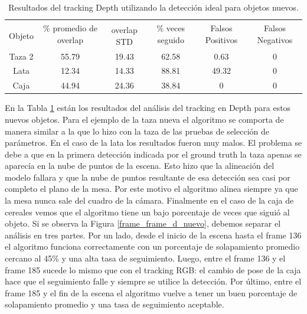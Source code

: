 \begin{table}[h]
    \begin{tabular}{|c|c|c|c|c|c|}
    \hline
    & \multirow{2}{2.4cm}{\% promedio de overlap} & & \multirow{2}{2cm}{\% veces seguido} & \multirow{2}{1.6cm}{Falsos Positivos} & \multirow{2}{1.6cm}{Falsos Negativos}\\
	Objeto & & overlap STD & & &\\
    \hline
    Taza 2  & 55.79      & 19.43       & 62.58             & 0.63             & 0\\
    \hline
    Lata    & 12.34      & 14.33       & 88.81             & 49.32            & 0\\
    \hline
    Caja    & 44.94      & 24.36       & 38.84             & 0                & 0\\
    \hline
    \end{tabular}
\caption{Resultados del tracking Depth utilizando la detección ideal para objetos nuevos.}
\label{tabla_d_nuevos}
\end{table}

En la Tabla \ref{tabla_d_nuevos} están los resultados del análisis del tracking en Depth para estos nuevos objetos. Para el ejemplo de la taza nueva el algoritmo se comporta de manera similar a la que lo hizo con la taza de las pruebas de selección de parámetros. En el caso de la lata los resultados fueron muy malos. El problema se debe a que en la primera detección indicada por el ground truth la taza apenas se aparecía en la nube de puntos de la escena. Esto hizo que la alineación del modelo fallara y que la nube de puntos resultante de esa detección sea casi por completo el plano de la mesa. Por este motivo el algoritmo alinea siempre ya que la mesa nunca sale del cuadro de la cámara.
Finalmente en el caso de la caja de cereales vemos que el algoritmo tiene un bajo porcentaje de veces que siguió al objeto. Si se observa la Figura \ref{frame_frame_d_nuevo}, debemos separar el análisis en tres partes. Por un lado, desde el inicio de la escena hasta el frame 136 el algoritmo funciona correctamente con un porcentaje de solapamiento promedio cercano al 45\% y una alta tasa de seguimiento. Luego, entre el frame 136 y el frame 185 sucede lo mismo que con el tracking RGB: el cambio de pose de la caja hace que el seguimiento falle y siempre se utilice la detección. Por último, entre el frame 185 y el fin de la escena el algoritmo vuelve a tener un buen porcentaje de solapamiento promedio y una tasa de seguimiento aceptable.

